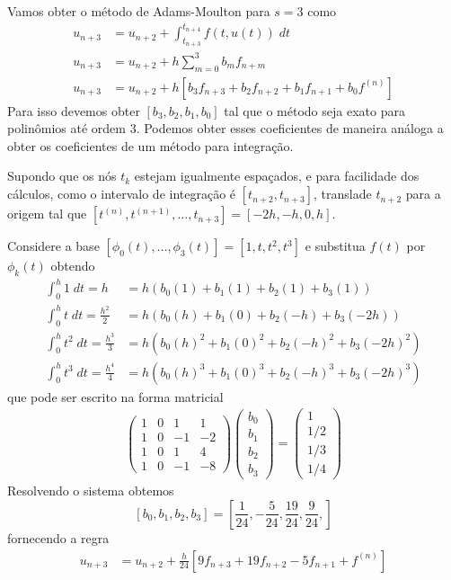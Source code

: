 \begin{ex}
Vamos obter o método de Adams-Moulton para $s=3$ como
\begin{eqnarray}\label{AM4}
  u_{n+3}  &= u_{n+2}  + \int _{t_{n+3}}^{t_{n+4}} f(t,u(t)) \; dt \\
  u_{n+3}  &= u_{n+2}  + h \sum_{m=0}^{3} b_m f_{n+m} \\
  u_{n+3}  &= u_{n+2}  + h [b_3f_{n+3} +b_2f_{n+2} +b_1f_{n+1} +b_0f^{(n)}]
\end{eqnarray}
Para isso devemos obter $[b_3,b_2,b_1,b_0]$ tal que o método seja exato para polinômios até ordem $3$. Podemos obter esses coeficientes de maneira análoga a obter os coeficientes de um método para integração.

Supondo que os nós $t_k$ estejam igualmente espaçados, e para facilidade dos cálculos, como o intervalo de integração é $[t_{n+2},t_{n+3}]$, translade $t_{n+2}$ para a origem tal que $[t^{(n)},t^{(n+1)},\ldots ,t_{n+3}]=[-2h,-h,0,h]$.

Considere a base $[\phi _0(t),\ldots ,\phi _3(t)]=[1, t, t^2, t^3]$ e substitua $f(t)$ por $\phi _k(t)$ obtendo
\begin{eqnarray*}
      \int _0^{h} 1  \;dt = h             &= h( b_0(1)  +b_1(1)   + b_2(1)   + b_3(1)    )\\
      \int _0^{h} t  \;dt = \frac{h^2}{2}  &= h( b_0(h)  +b_1(0)   + b_2(-h) + b_3(-2h)  )\\
      \int _0^{h} t^2 \;dt = \frac{h^3}{3}  &= h( b_0(h)^2 +b_1(0)^2  + b_2(-h)^2+ b_3(-2h)^2 )\\
      \int _0^{h} t^3 \;dt = \frac{h^4}{4} &= h( b_0(h)^3 +b_1(0)^3  + b_2(-h)^3+ b_3(-2h)^3 )
\end{eqnarray*}
que pode ser escrito na forma matricial
\begin{eqnarray}
\left(
  \begin{array}{cccc}
    1  & 0 & 1    & 1   \\
    1  & 0 & -1   & -2  \\
    1  & 0 & 1    & 4   \\
    1  & 0 & -1   & -8
  \end{array}
\right)
\left(\begin{array}{c}  b_0 \\ b_1\\ b_2\\b_3   \end{array}\right)
=
\left(\begin{array}{c}  1  \\ 1/2 \\ 1/3 \\ 1/4  \end{array}\right)
\end{eqnarray}
Resolvendo o sistema obtemos
$$[b_0,b_1,b_2,b_3]=[\frac{1}{24},-\frac{5}{24},\frac{19}{24},\frac{9}{24},]$$
fornecendo a regra
\begin{eqnarray}
  u_{n+3}  &= u_{n+2}  + \frac{h}{24} [9 f_{n+3} +19f_{n+2} -5f_{n+1} +f^{(n)}]
\end{eqnarray}
\end{ex}

